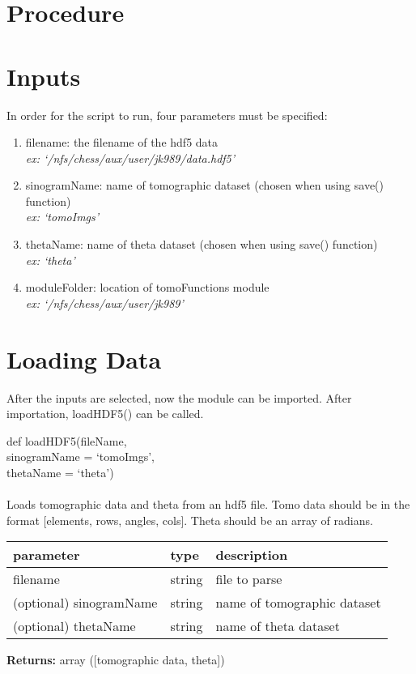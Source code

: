 \documentclass[10pt]{article}
\begin{document}
\section*{Procedure}\label{Procedure}
\section{Inputs}
In order for the script to run, four parameters must be specified:
\begin{enumerate}
    \item filename: the filename of the hdf5 data \\ 
    \textit{ex: `/nfs/chess/aux/user/jk989/data.hdf5'}
    \item sinogramName: name of tomographic dataset (chosen when using save() function)\\
    \textit{ex: `tomoImgs'}
    \item thetaName: name of theta dataset (chosen when using save() function)\\
    \textit{ex: `theta'}
    \item moduleFolder: location of tomoFunctions module\\
    \textit{ex: `/nfs/chess/aux/user/jk989'}
\end{enumerate}
\section{Loading Data}
After the inputs are selected, now the module can be imported. After importation, loadHDF5() can be called.\\
\begin{center} def loadHDF5(fileName,\\sinogramName = `tomoImgs',\\ thetaName = `theta')\\
\ \\ Loads tomographic data and theta from an hdf5 file. Tomo data should be in the format [elements, rows, angles, cols]. Theta should be an array of radians.
\end{center}
\begin{table}[H]
    \centering
    \begin{tabular}{|l|l|l|}
        \hline
        \textbf{parameter} & \textbf{type} &\textbf{description}  \\ \hline
        filename & string & file to parse \\ \hline
        (optional) sinogramName & string & name of tomographic dataset \\ \hline
        (optional) thetaName & string & name of theta dataset \\ \hline
    \end{tabular}
\end{table}
{\center \textbf{Returns:} array ([tomographic data, theta])\\}
\end{document}
